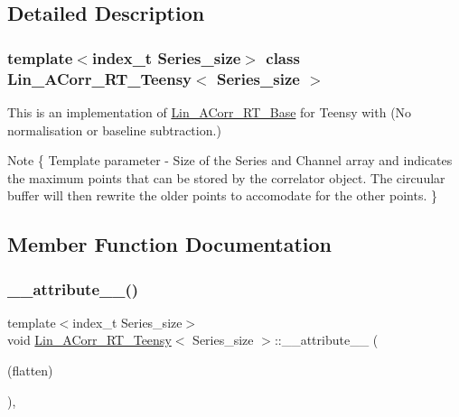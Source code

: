 \subsection{Detailed Description}
\subsubsection*{template$<$index\+\_\+t Series\+\_\+size$>$\newline
class Lin\+\_\+\+A\+Corr\+\_\+\+R\+T\+\_\+\+Teensy$<$ Series\+\_\+size $>$}

This is an implementation of \hyperlink{classLin__ACorr__RT__Base}{Lin\+\_\+\+A\+Corr\+\_\+\+R\+T\+\_\+\+Base} for Teensy with {\bfseries }(No normalisation or baseline subtraction.) 

\begin{DoxyNote}{Note}
\{ Template parameter -\/ Size of the Series and Channel array and indicates the maximum points that can be stored by the correlator object. The circuular buffer will then rewrite the older points to accomodate for the other points. \} 
\end{DoxyNote}


\subsection{Member Function Documentation}
\mbox{\label{classLin__ACorr__RT__Teensy_ac07a3acf4e259aee8e5379b0dd327b6c}} 
\subsubsection{\texorpdfstring{\+\_\+\+\_\+attribute\+\_\+\+\_\+()}{\_\_attribute\_\_()}\hspace{0.1cm}{\footnotesize\ttfamily [1/2]}}
{\footnotesize\ttfamily template$<$index\+\_\+t Series\+\_\+size$>$ \\
void \hyperlink{classLin__ACorr__RT__Teensy}{Lin\+\_\+\+A\+Corr\+\_\+\+R\+T\+\_\+\+Teensy}$<$ Series\+\_\+size $>$\+::\+\_\+\+\_\+attribute\+\_\+\+\_\+ (\begin{DoxyParamCaption}\item[{(flatten)}]{ }\end{DoxyParamCaption})\hspace{0.3cm}{\ttfamily [inline]}, {\ttfamily [override]}}



